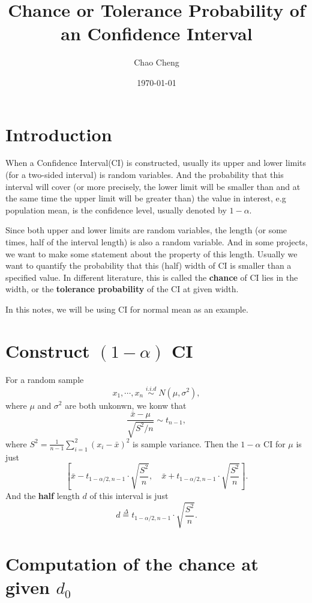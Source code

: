 \documentclass[a4paper,12pt]{article}
\title{Chance or Tolerance Probability of an Confidence Interval}
\author{Chao Cheng}
\date{\today}
\begin{document}
\maketitle

\section{Introduction}
\label{sec:introduction}

When a Confidence Interval(CI) is constructed, usually its upper and lower limits (for a two-sided interval) is random variables. And the probability that this interval will cover (or more precisely, the lower limit will be smaller than and at the same time the upper limit will be greater than) the value in interest, e.g population mean, is the confidence level, usually denoted by $1 - \alpha$.
\par
Since both upper and lower limits are random variables, the length (or some times, half of the interval length) is also a random variable. And in some projects, we want to make some statement about the property of this length. Usually we want to quantify the probability that this (half) width of CI is smaller than a specified value. In different literature, this is called the \textbf{chance} of CI lies in the width, or the \textbf{tolerance probability} of the CI at given width.
\par
In this notes, we will be using CI for normal mean as an example.

\section{Construct $\left(1 - \alpha\right)$ CI}
\label{sec:construct-1-alpha}

For a random sample
\[
  x_1, \cdots, x_n\; \overset{i.i.d}{\sim}\; N\left(\mu, \sigma^2\right)
  ,
\]
where $\mu$ and $\sigma^2$ are both unkonwn, we konw that
\[
  \frac{\bar{x} - \mu}{\sqrt{S^2 / n}} \sim t_{n - 1}
  ,
\]
where $S^2 = \frac{1}{n - 1}\sum\limits_{i = 1}^2\left(x_i - \bar{x}\right)^2$ is sample variance. Then the $1 - \alpha$ CI for $\mu$ is just
\[
  \left[
    \bar{x}
    - t_{1 - \alpha / 2, n - 1}
    \cdot \sqrt{\frac{S^2}{n}}
    ,\quad
    \bar{x}
    + t_{1 - \alpha / 2, n - 1}
    \cdot \sqrt{\frac{S^2}{n}} 
  \right]
  .
\]
And the \textbf{half} length $d$ of this interval is just
\[
  d \overset{\Delta}{=} t_{1 - \alpha / 2, n - 1}
  \cdot \sqrt{\frac{S^2}{n}}
  .
\]

\section{Computation of the chance at given $d_0$}
\label{sec:comp-chance-at}
\end{document}
